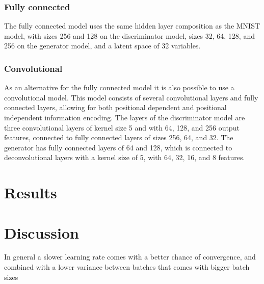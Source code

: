 \subsubsection{Fully connected}
The fully connected model uses the same hidden layer composition as the MNIST model, with sizes
256 and 128 on the discriminator model, sizes 32, 64, 128, and 256 on the generator model, and a
latent space of 32 variables.

\subsubsection{Convolutional}
As an alternative for the fully connected model it is also possible to use a convolutional model.
This model consists of several convolutional layers and fully connected layers, allowing for both
positional dependent and positional independent information encoding.
The layers of the discriminator model are three convolutional layers of kernel size 5 and with
64, 128, and 256 output features, connected to fully connected layers of sizes 256, 64, and 32.
The generator has fully connected layers of 64 and 128, which is connected to deconvolutional
layers with a kernel size of 5, with 64, 32, 16, and 8 features.

\section{Results}\label{sec:results}


\section{Discussion}\label{sec:discussion}
In general a slower learning rate comes with a better chance of convergence, and combined with a
lower variance between batches that comes with bigger batch sizes

